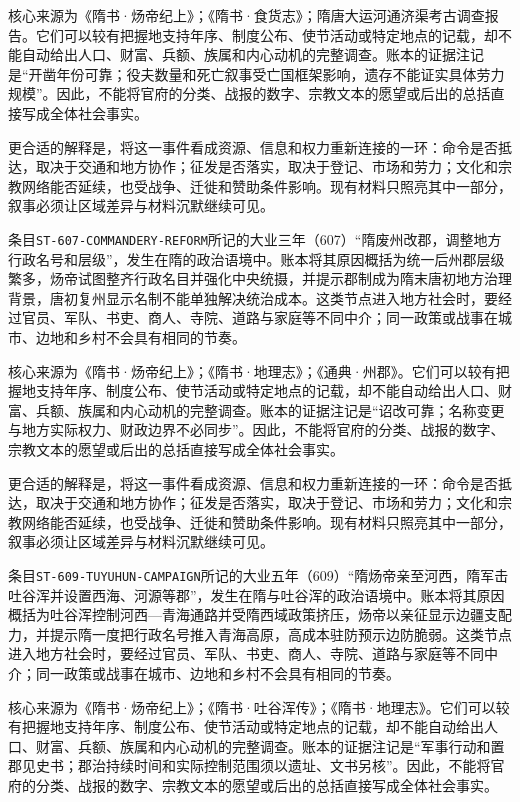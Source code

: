 核心来源为《隋书·炀帝纪上》；《隋书·食货志》；隋唐大运河通济渠考古调查报告。它们可以较有把握地支持年序、制度公布、使节活动或特定地点的记载，却不能自动给出人口、财富、兵额、族属和内心动机的完整调查。账本的证据注记是“开凿年份可靠；役夫数量和死亡叙事受亡国框架影响，遗存不能证实具体劳力规模”。因此，不能将官府的分类、战报的数字、宗教文本的愿望或后出的总括直接写成全体社会事实。

更合适的解释是，将这一事件看成资源、信息和权力重新连接的一环：命令是否抵达，取决于交通和地方协作；征发是否落实，取决于登记、市场和劳力；文化和宗教网络能否延续，也受战争、迁徙和赞助条件影响。现有材料只照亮其中一部分，叙事必须让区域差异与材料沉默继续可见。

条目\texttt{ST-607-COMMANDERY-REFORM}所记的大业三年（607）“隋废州改郡，调整地方行政名号和层级”，发生在隋的政治语境中。账本将其原因概括为统一后州郡层级繁多，炀帝试图整齐行政名目并强化中央统摄，并提示郡制成为隋末唐初地方治理背景，唐初复州显示名制不能单独解决统治成本。这类节点进入地方社会时，要经过官员、军队、书吏、商人、寺院、道路与家庭等不同中介；同一政策或战事在城市、边地和乡村不会具有相同的节奏。

核心来源为《隋书·炀帝纪上》；《隋书·地理志》；《通典·州郡》。它们可以较有把握地支持年序、制度公布、使节活动或特定地点的记载，却不能自动给出人口、财富、兵额、族属和内心动机的完整调查。账本的证据注记是“诏改可靠；名称变更与地方实际权力、财政边界不必同步”。因此，不能将官府的分类、战报的数字、宗教文本的愿望或后出的总括直接写成全体社会事实。

更合适的解释是，将这一事件看成资源、信息和权力重新连接的一环：命令是否抵达，取决于交通和地方协作；征发是否落实，取决于登记、市场和劳力；文化和宗教网络能否延续，也受战争、迁徙和赞助条件影响。现有材料只照亮其中一部分，叙事必须让区域差异与材料沉默继续可见。

条目\texttt{ST-609-TUYUHUN-CAMPAIGN}所记的大业五年（609）“隋炀帝亲至河西，隋军击吐谷浑并设置西海、河源等郡”，发生在隋与吐谷浑的政治语境中。账本将其原因概括为吐谷浑控制河西—青海通路并受隋西域政策挤压，炀帝以亲征显示边疆支配力，并提示隋一度把行政名号推入青海高原，高成本驻防预示边防脆弱。这类节点进入地方社会时，要经过官员、军队、书吏、商人、寺院、道路与家庭等不同中介；同一政策或战事在城市、边地和乡村不会具有相同的节奏。

核心来源为《隋书·炀帝纪上》；《隋书·吐谷浑传》；《隋书·地理志》。它们可以较有把握地支持年序、制度公布、使节活动或特定地点的记载，却不能自动给出人口、财富、兵额、族属和内心动机的完整调查。账本的证据注记是“军事行动和置郡见史书；郡治持续时间和实际控制范围须以遗址、文书另核”。因此，不能将官府的分类、战报的数字、宗教文本的愿望或后出的总括直接写成全体社会事实。

